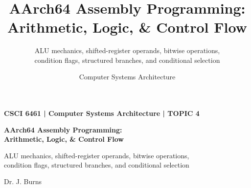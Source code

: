 \documentclass[aspectratio=169,11pt,t]{beamer}
\title[Topic 4]{
  AArch64 Assembly Programming:\\
  Arithmetic, Logic, \& Control Flow
}
\subtitle{
  ALU mechanics, shifted-register operands, bitwise operations,\\
  condition flags, structured branches, and conditional selection
}
\author{
  Computer Systems Architecture
}
\date{}
\begin{document}

\begin{frame}[plain]


\vspace*{\fill}

\begin{minipage}{0.88\textwidth}

{\color{gold}\normalsize\bfseries
CSCI 6461 \;|\; Computer Systems Architecture \;|\; TOPIC 4
\par}

\vspace{0.25cm}

{\color{white}\fontsize{24}{28}\selectfont\bfseries
AArch64 Assembly Programming:\\[0.08cm]Arithmetic, Logic, \& Control Flow
\par}

\vspace{0.35cm}

{\color{white!80}\large
ALU mechanics, shifted-register operands, bitwise operations,\\condition flags, structured branches, and conditional selection
\par}

\end{minipage}

\vfill

{\color{white!70}\small
Dr. J. Burns
\par}

\vspace*{\fill}

\end{frame}






\end{document}
